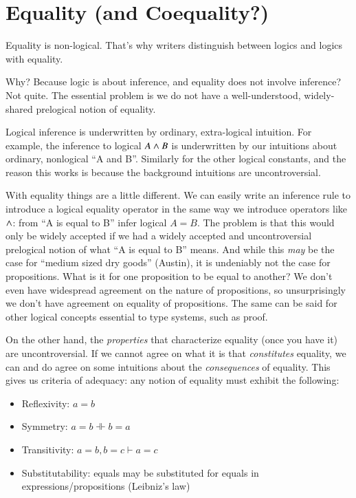 \section{Equality (and Coequality?)}

Equality is non-logical. That's why writers distinguish between logics
and logics with equality.

Why? Because logic is about inference, and equality does not involve
inference? Not quite. The essential problem is we do not have a well-understood, widely-shared prelogical notion of equality.

Logical inference is underwritten by ordinary, extra-logical
intuition. For example, the inference to logical \(A\land B\) is
underwritten by our intuitions about ordinary, nonlogical ``A and B''.
Similarly for the other logical constants, and the reason this works
is because the background intuitions are uncontroversial.

With equality things are a little different. We can easily write an
inference rule to introduce a logical equality operator in the same
way we introduce operators like \(\land\): from ``A is equal to B''
infer logical \(A=B\). The problem is that this would only be widely
accepted if we had a widely accepted and uncontroversial prelogical
notion of what ``A is equal to B'' means. And while this \textit{may}
be the case for ``medium sized dry goods'' (Austin), it is undeniably
not the case for propositions. What is it for one proposition to be
equal to another? We don't even have widespread agreement on the
nature of propositions, so unsurprisingly we don't have agreement on
equality of propositions. The same can be said for other logical
concepts essential to type systems, such as proof.

On the other hand, the \textit{properties} that characterize equality
(once you have it) are uncontroversial. If we cannot agree on what it
is that \textit{constitutes} equality, we can and do agree on some
intuitions about the \textit{consequences} of equality. This gives us
criteria of adequacy: any notion of equality must exhibit the
following:

\begin{itemize}
\item Reflexivity: \(a=b\)
\item Symmetry: \(a=b \dashVdash b=a\)
\item Transitivity: \(a=b, b=c \vdash a=c\)
\item Substitutability: equals may be substituted for equals in
  expressions/propositions (Leibniz's law)
\end{itemize}


